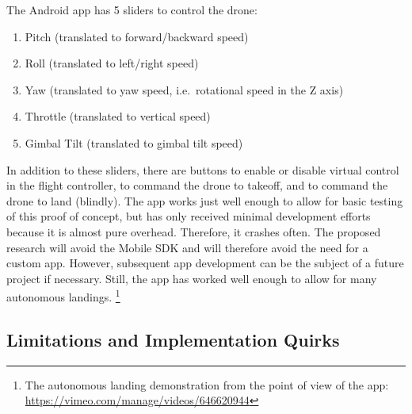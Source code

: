 The Android app has 5 sliders to control the drone:
\begin{enumerate}
    \item Pitch (translated to forward/backward speed)
    \item Roll (translated to left/right speed)
    \item Yaw (translated to yaw speed, i.e.~rotational speed in the Z axis)
    \item Throttle (translated to vertical speed)
    \item Gimbal Tilt (translated to gimbal tilt speed)
\end{enumerate}
In addition to these sliders, there are buttons to enable or disable virtual control in the flight controller,
to command the drone to takeoff,
and to command the drone to land (blindly).
The app works just well enough to allow for basic testing of this proof of concept,
but has only received minimal development efforts because it is almost pure overhead.
Therefore, it crashes often.
The proposed research will avoid the Mobile SDK and will therefore avoid the need for a custom app.
However, subsequent app development can be the subject of a future project if necessary.
Still, the app has worked well enough to allow for many autonomous landings.
\footnote{The autonomous landing demonstration from the point of view of the app: \url{https://vimeo.com/manage/videos/646620944}}

\subsection{Limitations and Implementation Quirks}


